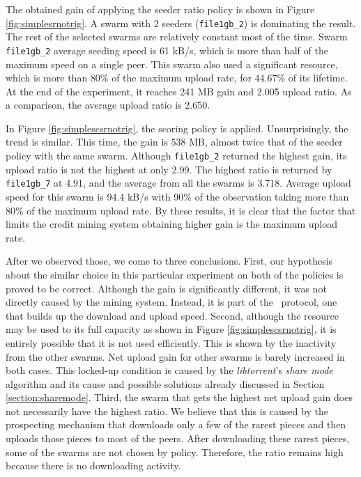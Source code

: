 The obtained gain of applying the seeder ratio policy is shown in Figure \ref{fig:simplesrnotrig}. A swarm with 2 seeders (\texttt{file1gb\_2}) is dominating the result. The rest of the selected swarms are relatively constant most of the time. Swarm \texttt{file1gb\_2} average seeding speed is 61 kB/s, which is more than half of the maximum speed on a single peer. This swarm also used a significant resource, which is more than 80\% of the maximum upload rate, for 44.67\% of its lifetime. At the end of the experiment, it reaches 241 MB gain and 2.005 upload ratio. As a comparison, the average upload ratio is 2.650.

In Figure \ref{fig:simplescsrnotrig}, the scoring policy is applied. Unsurprisingly, the trend is similar. This time, the gain is 538 MB, almost twice that of the seeder policy with the same swarm.  Although \texttt{file1gb\_2} returned the highest gain, its upload ratio is not the highest at only 2.99.  The highest ratio is returned by \texttt{file1gb\_7} at 4.91, and the average from all the swarms is 3.718. Average upload speed for this swarm is 94.4 kB/s with 90\% of the observation taking more than 80\% of the maximum upload rate. By these results, it is clear that the factor that limits the credit mining system obtaining higher gain is the maximum upload rate. 

After we observed those, we come to three conclusions. First, our hypothesis about the similar choice in this particular experiment on both of the policies is proved to be correct. Although the gain is significantly different, it was not directly caused by the mining system. Instead, it is part of the \bt~protocol, one that builds up the download and upload speed. Second, although the resource may be used to its full capacity as shown in Figure \ref{fig:simplescsrnotrig}, it is entirely possible that it is not used efficiently. This is shown by the inactivity from the other swarms. Net upload gain for other swarms is barely increased in both cases. This locked-up condition is caused by the \textit{libtorrent}'s \textit{share mode} algorithm and its cause and possible solutions already discussed in Section \ref{section:sharemode}. Third, the swarm that gets the highest net upload gain does not necessarily have the highest ratio. We believe that this is caused by the prospecting mechanism that downloads only a few of the rarest pieces and then uploads those pieces to most of the peers. After downloading these rarest pieces, some of the swarms are not chosen by policy. Therefore, the ratio remains high because there is no downloading activity.

